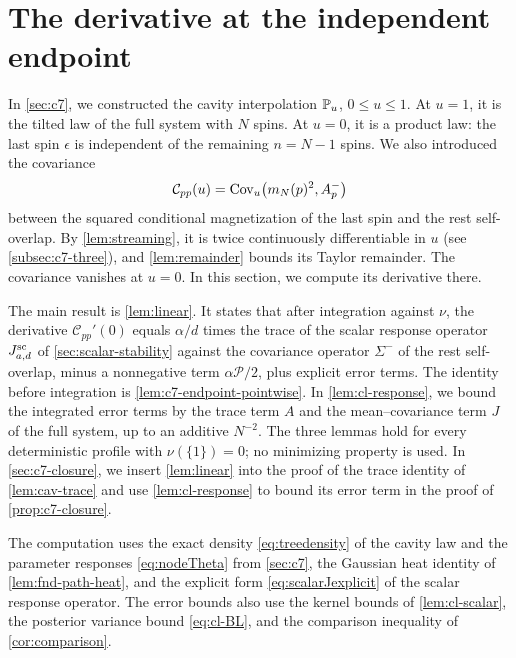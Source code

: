 \chapter{The derivative at the independent endpoint}\label{sec:c7-endpoint}

In \cref{sec:c7}, we constructed the cavity interpolation $\mathbb P_u$,
$0\le u\le1$. At $u=1$, it is the tilted law of the full system with
$N$ spins. At $u=0$, it is a product law: the last spin $\epsilon$ is
independent of the remaining $n=N-1$ spins. We also introduced the
covariance
\[
 \mathcal C_{pp}(u)=\operatorname{Cov}_u\bigl(m_N(p)^2,A_p^-\bigr)
\]
between the squared conditional magnetization of the last spin and the
rest self-overlap. By \cref{lem:streaming}, it is twice continuously
differentiable in $u$ (see \cref{subsec:c7-three}), and
\cref{lem:remainder} bounds its Taylor remainder. The covariance
vanishes at $u=0$. In this section, we compute its derivative there.

The main result is \cref{lem:linear}. It states that after
integration against $\nu$, the derivative $\mathcal C_{pp}'(0)$ equals
$\alpha/d$ times the trace of the scalar response operator
$J^{\mathrm{sc}}_{a,d}$ of \cref{sec:scalar-stability} against the
covariance operator $\Sigma^-$ of the rest self-overlap, minus a
nonnegative term $\alpha\mathcal P/2$, plus explicit error terms. The
identity before integration is \cref{lem:c7-endpoint-pointwise}. In
\cref{lem:cl-response}, we bound the integrated error terms by the
trace term $A$ and the mean--covariance term $J$ of the full system,
up to an additive $N^{-2}$. The three lemmas hold for every
deterministic profile with $\nu(\{1\})=0$; no minimizing property is
used. In
\cref{sec:c7-closure}, we insert \cref{lem:linear} into the proof of
the trace identity of \cref{lem:cav-trace} and use
\cref{lem:cl-response} to bound its error term in the proof of
\cref{prop:c7-closure}.

The computation uses the exact density \eqref{eq:treedensity} of the
cavity law and the parameter responses \eqref{eq:nodeTheta} from
\cref{sec:c7}, the Gaussian heat identity of \cref{lem:fnd-path-heat},
and the explicit form \eqref{eq:scalarJexplicit} of the scalar
response operator. The error bounds also use the kernel bounds of
\cref{lem:cl-scalar}, the posterior variance bound \eqref{eq:cl-BL},
and the comparison inequality of \cref{cor:comparison}.

